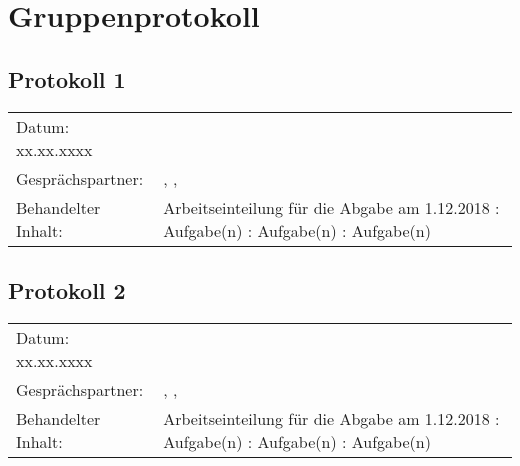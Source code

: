 \section {Gruppenprotokoll}

\subsection*{Protokoll 1}

\begin{tabular}{p{} p{}}
	Datum: xx.xx.xxxx \\
	Gesprächspartner: & \emplA, \emplC, \supervisor \\
	Behandelter Inhalt: & Arbeitseinteilung für die Abgabe am 1.12.2018 \newline
	 \emplA: Aufgabe(n) \newline
	 \emplB: Aufgabe(n) \newline
	 \emplC: Aufgabe(n) \newline
\end{tabular}

\subsection*{Protokoll 2}

\begin{tabular}{p{} p{}}
	Datum: xx.xx.xxxx \\
	Gesprächspartner: & \emplA, \emplC, \supervisor \\
	Behandelter Inhalt: & Arbeitseinteilung für die Abgabe am 1.12.2018 \newline
	\emplA: Aufgabe(n) \newline
	\emplB: Aufgabe(n) \newline
	\emplC: Aufgabe(n) \newline
\end{tabular}